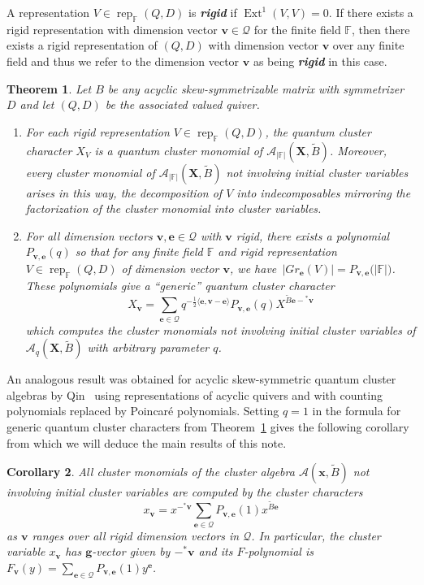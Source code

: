 \documentclass[12pt]{amsart}
\newtheorem{theorem}{Theorem}
\newtheorem{corollary}[theorem]{Corollary}
\newcommand{\bfe}{\mathbf{e}}
\newcommand{\bfg}{\mathbf{g}}
\newcommand{\bfv}{\mathbf{v}}
\newcommand{\bfx}{\mathbf{x}}
\newcommand{\bfX}{\mathbf{X}}
\newcommand{\cA}{\mathcal{A}}
\newcommand{\cQ}{\mathcal{Q}}
\newcommand{\FF}{\mathbb{F}}
\newcommand{\Ext}{\operatorname{Ext}}
\newcommand{\half}{{\frac{1}{2}}}
\newcommand{\rep}{\operatorname{rep}}
\newcommand{\newword}[1]{\textbf{\emph{#1}}}
\newenvironment{enumeratea}{\begin{enumerate}[\upshape (a)]}{\end{enumerate}}
\begin{document}
  A representation $V\in\rep_\FF(Q,D)$ is \newword{rigid} if $\Ext^1(V,V)=0$.
  If there exists a rigid representation with dimension vector $\bfv\in\cQ$ for the finite field $\FF$, then there exists a rigid representation of $(Q,D)$ with dimension vector $\bfv$ over any finite field and thus we refer to the dimension vector $\bfv$ as being \newword{rigid} in this case.
  \begin{theorem}\cite{rupel1,rupel2}
    \label{th:quantum cluster characters}
    Let $B$ be any acyclic skew-symmetrizable matrix with symmetrizer $D$ and let $(Q,D)$ be the associated valued quiver.
    \begin{enumeratea}
      \item 
        For each rigid representation $V\in\rep_\FF(Q,D)$, the quantum cluster character $X_V$ is a quantum cluster monomial of $\cA_{|\FF|}(\bfX,\widetilde{B})$.  
        Moreover, every cluster monomial of $\cA_{|\FF|}(\bfX,\widetilde{B})$ not involving initial cluster variables arises in this way, the decomposition of $V$ into indecomposables mirroring the factorization of the cluster monomial into cluster variables.
      
      \item 
        For all dimension vectors $\bfv,\bfe\in\cQ$ with $\bfv$ rigid, there exists a polynomial $P_{\bfv,\bfe}(q)$ so that for any finite field $\FF$ and rigid representation $V\in\rep_\FF(Q,D)$ of dimension vector $\bfv$, we have~$\big|Gr_\bfe(V)\big|=P_{\bfv,\bfe}\big(|\FF|\big)$.
        These polynomials give a ``generic'' quantum cluster character 
        \[
          X_\bfv=\sum\limits_{\bfe\in\cQ} q^{-\half\langle\bfe,\bfv-\bfe\rangle}P_{\bfv,\bfe}(q)X^{\widetilde{B}\bfe-{}^*\bfv}
        \]
        which computes the cluster monomials not involving initial cluster variables of $\cA_q(\bfX,\widetilde{B})$ with arbitrary parameter $q$.
    \end{enumeratea}
  \end{theorem}
  An analogous result was obtained for acyclic skew-symmetric quantum cluster algebras by Qin~\cite{qin} using representations of acyclic quivers and with counting polynomials replaced by Poincar\'e polynomials.
  Setting $q=1$ in the formula for generic quantum cluster characters from Theorem~\ref{th:quantum cluster characters} gives the following corollary from which we will deduce the main results of this note.
  \begin{corollary}
    \label{cor:classical cluster characters}
    All cluster monomials of the cluster algebra $\cA(\bfx,\widetilde{B})$ not involving initial cluster variables are computed by the cluster characters
    \[
      x_\bfv
      =
      x^{-{}^*\bfv}\sum\limits_{\bfe\in\cQ} P_{\bfv,\bfe}(1)x^{\widetilde{B}\bfe}
    \]
    as $\bfv$ ranges over all rigid dimension vectors in $\cQ$.
    In particular, the cluster variable $x_\bfv$ has $\bfg$-vector given by $-{}^*\bfv$ and its $F$-polynomial is $F_\bfv(y)=\sum\limits_{\bfe\in\cQ} P_{\bfv,\bfe}(1)y^\bfe$.
  \end{corollary}
\end{document}
